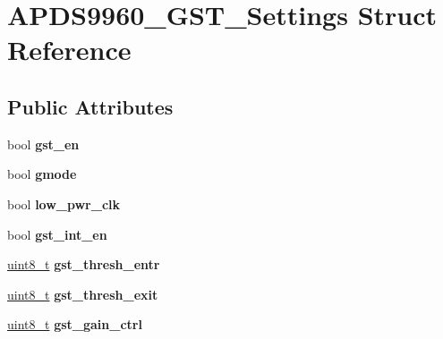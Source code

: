 \hypertarget{structAPDS9960__GST__Settings}{}\section{A\+P\+D\+S9960\+\_\+\+G\+S\+T\+\_\+\+Settings Struct Reference}
\label{structAPDS9960__GST__Settings}
\subsection*{Public Attributes}
\begin{DoxyCompactItemize}
\item 
\mbox{\label{structAPDS9960__GST__Settings_a22b1891a0b87f0fb032b8873619c23f6}} 
bool {\bfseries gst\+\_\+en}
\item 
\mbox{\label{structAPDS9960__GST__Settings_acc5de6a7e15d4d9317c7875366616df2}} 
bool {\bfseries gmode}
\item 
\mbox{\label{structAPDS9960__GST__Settings_a6d4ee381934228214c7b6600295fd01a}} 
bool {\bfseries low\+\_\+pwr\+\_\+clk}
\item 
\mbox{\label{structAPDS9960__GST__Settings_af310644079e508cee68becc26b60cabc}} 
bool {\bfseries gst\+\_\+int\+\_\+en}
\item 
\mbox{\label{structAPDS9960__GST__Settings_a98e34db047aa71fb1b50de1a2221583c}} 
\hyperlink{vl53l0x__types_8h_aba7bc1797add20fe3efdf37ced1182c5}{uint8\+\_\+t} {\bfseries gst\+\_\+thresh\+\_\+entr}
\item 
\mbox{\label{structAPDS9960__GST__Settings_ac4328cd9a486f3f17b061cd32844b531}} 
\hyperlink{vl53l0x__types_8h_aba7bc1797add20fe3efdf37ced1182c5}{uint8\+\_\+t} {\bfseries gst\+\_\+thresh\+\_\+exit}
\item 
\mbox{\label{structAPDS9960__GST__Settings_a7c7650ca944df56abd67922d05acb411}} 
\hyperlink{vl53l0x__types_8h_aba7bc1797add20fe3efdf37ced1182c5}{uint8\+\_\+t} {\bfseries gst\+\_\+gain\+\_\+ctrl}
\item 

\end{DoxyCompactItemize}
